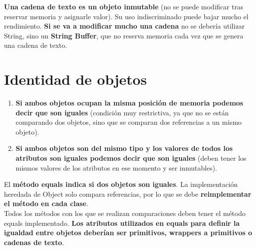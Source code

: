 \documentclass{article}
\begin{document}
\textbf{Una cadena de texto es un objeto inmutable} (no se puede modificar tras reservar memoria y asignarle valor). Su uso indiscriminado puede bajar mucho el rendimiento. \textbf{Si se va a modificar mucho una cadena} no se debería utilizar String, sino un \textbf{String Buffer}, que no reserva memoria cada vez que se genera una cadena de texto.

\section{Identidad de objetos}
\begin{enumerate}
    \item \textbf{Si ambos objetos ocupan la misma posición de memoria podemos decir que son iguales} (condición muy restrictiva, ya que no se están comparando dos objetos, sino que se comparan dos referencias a un mismo objeto).

    \item \textbf{Si ambos objetos son del mismo tipo y los valores de todos los atributos son iguales podemos decir que son iguales} (deben tener los mismos valores de los atributos en ese momento y ser inmutables).
\end{enumerate}

El \textbf{método equals indica si dos objetos son iguales}. La implementación heredada de Object solo compara referencias, por lo que se debe \textbf{reimplementar el método en cada clase}. \\
Todos los métodos con los que se realizan comparaciones deben tener el método equals implementado. \textbf{Los atributos utilizados en equals para definir la igualdad entre objetos deberían ser primitivos, wrappers a primitivos o cadenas de texto}.

\end{document}
